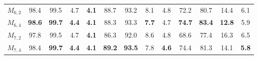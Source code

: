 \begin{table}[t]
{\begin{adjustbox}{width=1.3\textwidth,center}
\begin{tabular}{|c|cccc|cccc|cccc|}
                $M_{6,2}$                        & 98.4                         & 99.5                         & 4.7           & \textbf{4.1}           & 88.7                         & 93.2                         & 8.1          & 4.8           & 72.2                         & 80.7                         & 14.4          & 6.1           \\
                $M_{6,4}$                        & \textbf{98.6}                         & \textbf{99.7}                         & \textbf{4.4}           & \textbf{4.1}           & 88.3                         & 93.3                         & \textbf{7.7}          & 4.7           & \textbf{74.7}                         & \textbf{83.4}                         & \textbf{12.8}          & 5.9           \\
                $M_{7,2}$                        & 97.8                         & 99.5                         & 4.7           & \textbf{4.1}           & 86.3                         & 92.0                         & 8.6          & 4.8           & 68.6                         & 77.4                         & 16.3          & 6.5           \\
                $M_{7,4}$                        & 98.4                         & \textbf{99.7}                         & \textbf{4.4}           & \textbf{4.1}           & \textbf{89.2}                         & \textbf{93.5}                         & 7.8          & \textbf{4.6}           & 74.4                         & 81.3                         & 14.1          & \textbf{5.8}           \\ \hline
            \end{tabular}
            \label{tab:multiLoca_featureExtraction_resultsSimulatedSRIRs}
        \end{adjustbox}
    }
        
\end{table}
